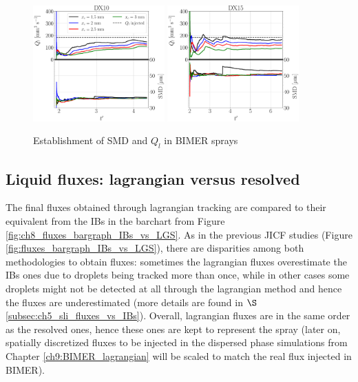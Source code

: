 \begin{figure}[ht]
	\centering
   \includegraphics[width=0.45\textwidth]{./part3_applications/figures_ch8_resolved/SPRAY_characterization/establishment_and_fluxes/establishment_DX10}
   \includegraphics[width=0.45\textwidth]{./part3_applications/figures_ch8_resolved/SPRAY_characterization/establishment_and_fluxes/establishment_DX15}
   \caption{Establishment of SMD and $Q_l$ in BIMER sprays}
\label{fig:ch8_spray_char_establishment}
\end{figure}

\subsection{Liquid fluxes: lagrangian versus resolved}

The final fluxes obtained through lagrangian tracking are compared to their equivalent from the IBs in the barchart from Figure \ref{fig:ch8_fluxes_bargraph_IBs_vs_LGS}. As in the previous JICF studies (Figure \ref{fig:fluxes_bargraph_IBs_vs_LGS}), there are disparities among both methodologies to obtain fluxes: sometimes the lagrangian fluxes overestimate the IBs ones due to droplets being tracked more than once, while in other cases some droplets might not be detected at all through the lagrangian method and hence the fluxes are underestimated (more details are found in $\S$\ref{subsec:ch5_sli_fluxes_vs_IBs}). Overall, lagrangian fluxes are in the same order as the resolved ones, hence these ones are kept to represent the spray (later on, spatially discretized fluxes to be injected in the dispersed phase simulations from Chapter \ref{ch9:BIMER_lagrangian} will be scaled to match the real flux injected in BIMER).




